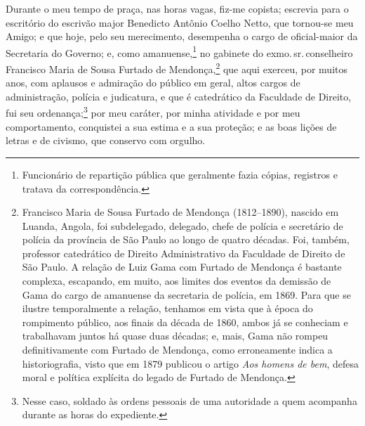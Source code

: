 Durante o meu tempo de praça, nas horas vagas, fiz-me copista; escrevia
para o escritório do escrivão major Benedicto Antônio Coelho Netto, que
tornou-se meu Amigo; e que hoje, pelo seu merecimento, desempenha o
cargo de oficial-maior da Secretaria do Governo; e, como
amanuense,\footnote{Funcionário de repartição pública que geralmente
  fazia cópias, registros e tratava da correspondência.} no gabinete do
exmo.\,sr.\,conselheiro Francisco Maria de Sousa Furtado de
Mendonça,\footnote{Francisco Maria de Sousa Furtado de Mendonça \label{fmfm}
  (1812--1890), nascido em Luanda, Angola, foi subdelegado, delegado,
  chefe de polícia e secretário de polícia da província de São Paulo ao
  longo de quatro décadas. Foi, também, professor catedrático de Direito
  Administrativo da Faculdade de Direito de São Paulo. A relação de Luiz
  Gama com Furtado de Mendonça é bastante complexa, escapando, em muito,
  aos limites dos eventos da demissão de Gama do cargo de amanuense da
  secretaria de polícia, em 1869. Para que se ilustre temporalmente a
  relação, tenhamos em vista que à época do rompimento público, aos
  finais da década de 1860, ambos já se conheciam e trabalhavam juntos
  há quase duas décadas; e, mais, Gama não rompeu definitivamente com
  Furtado de Mendonça, como erroneamente indica a historiografia, visto
  que em 1879 publicou o artigo \emph{Aos homens de bem}, defesa moral e
  política explícita do legado de Furtado de Mendonça.} que aqui
exerceu, por muitos anos, com aplausos e admiração do público em geral,
altos cargos de administração, polícia e judicatura, e que é catedrático
da Faculdade de Direito, fui seu ordenança;\footnote{Nesse caso,
  soldado às ordens pessoais de uma autoridade a quem acompanha durante
  as horas do expediente.} por meu caráter, por minha atividade e por
meu comportamento, conquistei a sua estima e a sua proteção; e as boas
lições de letras e de civismo, que conservo com orgulho.

